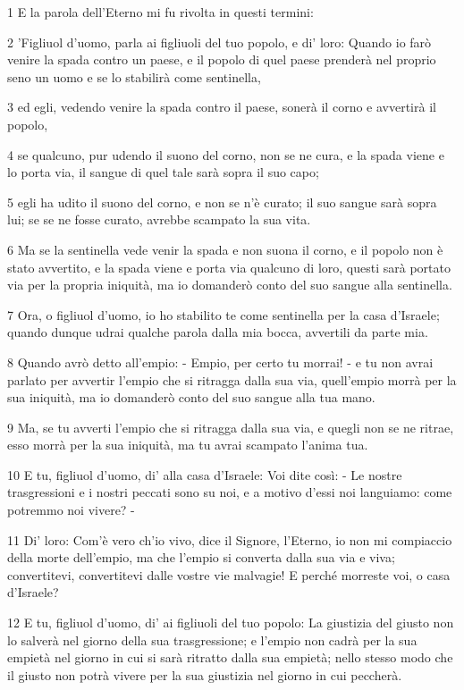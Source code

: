 \par 1 E la parola dell'Eterno mi fu rivolta in questi termini:
\par 2 'Figliuol d'uomo, parla ai figliuoli del tuo popolo, e di' loro: Quando io farò venire la spada contro un paese, e il popolo di quel paese prenderà nel proprio seno un uomo e se lo stabilirà come sentinella,
\par 3 ed egli, vedendo venire la spada contro il paese, sonerà il corno e avvertirà il popolo,
\par 4 se qualcuno, pur udendo il suono del corno, non se ne cura, e la spada viene e lo porta via, il sangue di quel tale sarà sopra il suo capo;
\par 5 egli ha udito il suono del corno, e non se n'è curato; il suo sangue sarà sopra lui; se se ne fosse curato, avrebbe scampato la sua vita.
\par 6 Ma se la sentinella vede venir la spada e non suona il corno, e il popolo non è stato avvertito, e la spada viene e porta via qualcuno di loro, questi sarà portato via per la propria iniquità, ma io domanderò conto del suo sangue alla sentinella.
\par 7 Ora, o figliuol d'uomo, io ho stabilito te come sentinella per la casa d'Israele; quando dunque udrai qualche parola dalla mia bocca, avvertili da parte mia.
\par 8 Quando avrò detto all'empio: - Empio, per certo tu morrai! - e tu non avrai parlato per avvertir l'empio che si ritragga dalla sua via, quell'empio morrà per la sua iniquità, ma io domanderò conto del suo sangue alla tua mano.
\par 9 Ma, se tu avverti l'empio che si ritragga dalla sua via, e quegli non se ne ritrae, esso morrà per la sua iniquità, ma tu avrai scampato l'anima tua.
\par 10 E tu, figliuol d'uomo, di' alla casa d'Israele: Voi dite così: - Le nostre trasgressioni e i nostri peccati sono su noi, e a motivo d'essi noi languiamo: come potremmo noi vivere? -
\par 11 Di' loro: Com'è vero ch'io vivo, dice il Signore, l'Eterno, io non mi compiaccio della morte dell'empio, ma che l'empio si converta dalla sua via e viva; convertitevi, convertitevi dalle vostre vie malvagie! E perché morreste voi, o casa d'Israele?
\par 12 E tu, figliuol d'uomo, di' ai figliuoli del tuo popolo: La giustizia del giusto non lo salverà nel giorno della sua trasgressione; e l'empio non cadrà per la sua empietà nel giorno in cui si sarà ritratto dalla sua empietà; nello stesso modo che il giusto non potrà vivere per la sua giustizia nel giorno in cui peccherà.
